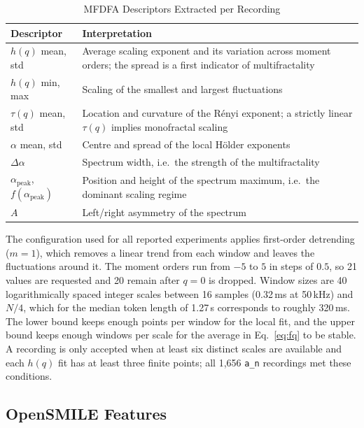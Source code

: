 \documentclass[runningheads]{llncs}
\begin{document}
  \begin{table}[htbp]
  \centering
  \caption{MFDFA Descriptors Extracted per Recording}
  \label{tab:mfdfa_features}
  \begin{tabular}{L{4.2cm} L{6.6cm}}
  \toprule
  \textbf{Descriptor} & \textbf{Interpretation} \\
  \midrule
  $h(q)$ mean, std & Average scaling exponent and its variation across moment orders; the spread is a first indicator of multifractality \\
  $h(q)$ min, max & Scaling of the smallest and largest fluctuations \\
  $\tau(q)$ mean, std & Location and curvature of the Rényi exponent; a strictly linear $\tau(q)$ implies monofractal scaling \\
  $\alpha$ mean, std & Centre and spread of the local H\"older exponents \\
  $\Delta\alpha$ & Spectrum width, i.e.\ the strength of the multifractality \\
  $\alpha_{\mathrm{peak}}$, $f(\alpha_{\mathrm{peak}})$ & Position and height of the spectrum maximum, i.e.\ the dominant scaling regime \\
  $A$ & Left/right asymmetry of the spectrum \\
  \bottomrule
  \end{tabular}
  \end{table}

  The configuration used for all reported experiments applies first-order detrending ($m = 1$), which removes a linear trend from each window and leaves the fluctuations around it. The moment orders run from $-5$ to $5$ in steps of $0.5$, so 21 values are requested and 20 remain after $q = 0$ is dropped. Window sizes are 40 logarithmically spaced integer scales between 16 samples (0.32\,ms at 50\,kHz) and $N/4$, which for the median token length of 1.27\,s corresponds to roughly 320\,ms. The lower bound keeps enough points per window for the local fit, and the upper bound keeps enough windows per scale for the average in Eq.~\eqref{eq:fq} to be stable. A recording is only accepted when at least six distinct scales are available and each $h(q)$ fit has at least three finite points; all 1,656 \texttt{a\_n} recordings met these conditions.

  \subsection{OpenSMILE Features}
\end{document}
